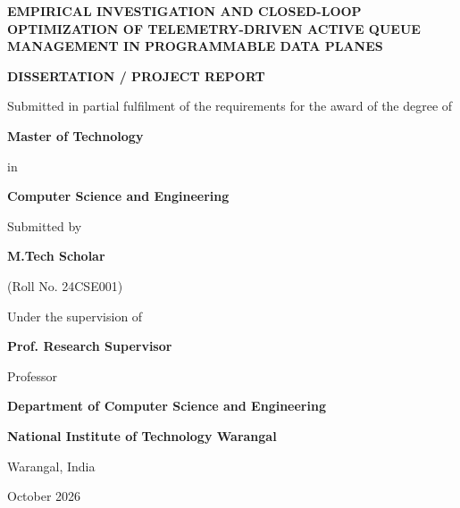 \documentclass[12pt,a4paper,oneside]{report}
\newcommand{\ReportTitle}{EMPIRICAL INVESTIGATION AND CLOSED-LOOP OPTIMIZATION OF TELEMETRY-DRIVEN ACTIVE QUEUE MANAGEMENT IN PROGRAMMABLE DATA PLANES}
\newcommand{\DegreeName}{Master of Technology}
\newcommand{\ProgrammeName}{Computer Science and Engineering}
\newcommand{\StudentName}{M.Tech Scholar}
\newcommand{\RollNumber}{Roll No. 24CSE001}
\newcommand{\SupervisorName}{Prof. Research Supervisor}
\newcommand{\SupervisorDesignation}{Professor}
\newcommand{\DepartmentName}{Department of Computer Science and Engineering}
\newcommand{\InstituteName}{National Institute of Technology Warangal}
\newcommand{\SubmissionMonthYear}{October 2026}
\newcommand{\PlaceName}{Warangal}
\newcommand{\InstituteLogo}{}
\begin{document}
\setcounter{page}{1}
\pagestyle{empty}

\begin{titlepage}
\begin{center}
  {\Large\bfseries \ReportTitle\par}
  \vspace{1.25cm}

  \InstituteLogo
  \vspace{0.75cm}

  {\large\bfseries DISSERTATION / PROJECT REPORT\par}
  \vspace{0.45cm}
  {\large Submitted in partial fulfilment of the requirements for the award of the degree of\par}
  \vspace{0.35cm}
  {\large\bfseries \DegreeName\par}
  \vspace{0.25cm}
  {\large in\par}
  \vspace{0.25cm}
  {\large\bfseries \ProgrammeName\par}
  \vspace{1.1cm}

  {\large Submitted by\par}
  \vspace{0.25cm}
  {\large\bfseries \StudentName\par}
  {\large (\RollNumber)\par}
  \vspace{0.9cm}

  {\large Under the supervision of\par}
  \vspace{0.25cm}
  {\large\bfseries \SupervisorName\par}
  {\large \SupervisorDesignation\par}
  \vfill

  {\large\bfseries \DepartmentName\par}
  \vspace{0.25cm}
  {\large\bfseries \InstituteName\par}
  \vspace{0.25cm}
  {\large \PlaceName, India\par}
  \vspace{0.45cm}
  {\large \SubmissionMonthYear\par}
\end{center}
\end{titlepage}
\end{document}
